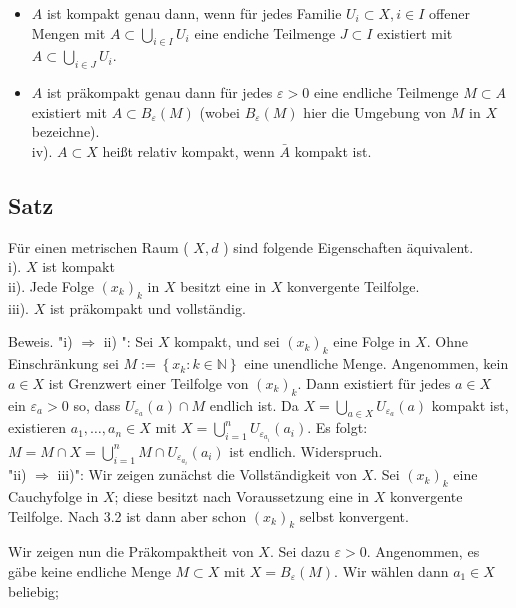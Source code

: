 \documentclass[10pt, letterpaper]{article}
\begin{document}
\begin{itemize}
  \item $A$ ist kompakt genau dann, wenn für jedes Familie $U_{i} \subset X, i \in I$ offener Mengen mit $A \subset \bigcup_{i \in I} U_{i}$ eine endiche Teilmenge $J \subset I$ existiert mit $A \subset \bigcup_{i \in J} U_{i}$.
  \item $A$ ist präkompakt genau dann für jedes $\varepsilon>0$ eine endliche Teilmenge $M \subset A$ existiert mit $A \subset B_{\varepsilon}(M)$ (wobei $B_{\varepsilon}(M)$ hier die Umgebung von $M$ in $X$ bezeichne).\\
iv). $A \subset X$ heißt relativ kompakt, wenn $\bar{A}$ kompakt ist.
\end{itemize}

\subsection*{Satz}
Für einen metrischen Raum ( $X, d$ ) sind folgende Eigenschaften äquivalent.\\
i). $X$ ist kompakt\\
ii). Jede Folge $\left(x_{k}\right)_{k}$ in $X$ besitzt eine in $X$ konvergente Teilfolge.\\
iii). $X$ ist präkompakt und vollständig.

Beweis. "i) $\Longrightarrow$ ii) ": Sei $X$ kompakt, und sei $\left(x_{k}\right)_{k}$ eine Folge in $X$. Ohne Einschränkung sei $M:=\left\{x_{k}: k \in \mathbb{N}\right\}$ eine unendliche Menge. Angenommen, kein $a \in X$ ist Grenzwert einer Teilfolge von $\left(x_{k}\right)_{k}$. Dann existiert für jedes $a \in X$ ein $\varepsilon_{a}>0$ so, dass $U_{\varepsilon_{a}}(a) \cap M$ endlich ist. Da $X=\bigcup_{a \in X} U_{\varepsilon_{a}}(a)$ kompakt ist, existieren $a_{1}, \ldots, a_{n} \in X$ mit $X=\bigcup_{i=1}^{n} U_{\varepsilon_{a_{i}}}\left(a_{i}\right)$. Es folgt: $M=M \cap X=\bigcup_{i=1}^{n} M \cap U_{\varepsilon_{a_{i}}}\left(a_{i}\right)$ ist endlich. Widerspruch.\\
"ii) $\Longrightarrow$ iii)": Wir zeigen zunächst die Vollständigkeit von $X$. Sei $\left(x_{k}\right)_{k}$ eine Cauchyfolge in $X$; diese besitzt nach Voraussetzung eine in $X$ konvergente Teilfolge. Nach 3.2 ist dann aber schon $\left(x_{k}\right)_{k}$ selbst konvergent.

Wir zeigen nun die Präkompaktheit von $X$. Sei dazu $\varepsilon>0$. Angenommen, es gäbe keine endliche Menge $M \subset X$ mit $X=B_{\varepsilon}(M)$. Wir wählen dann $a_{1} \in X$ beliebig;
\end{document}
